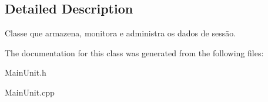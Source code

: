 \subsection{Detailed Description}
Classe que armazena, monitora e administra os dados de sessão. 



The documentation for this class was generated from the following files\-:\begin{DoxyCompactItemize}
\item 
Main\-Unit.\-h\item 
Main\-Unit.\-cpp\end{DoxyCompactItemize}
